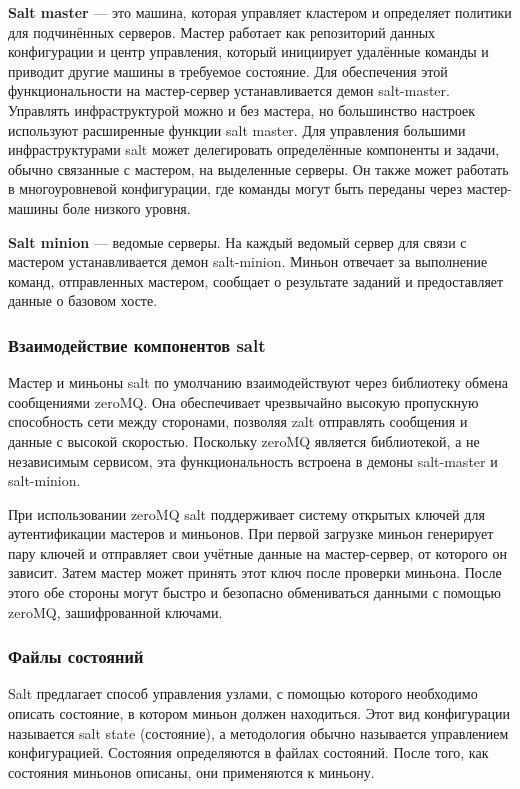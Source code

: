 \documentclass[a4paper]{extarticle}
\begin{document}
\bigbreak

\textbf{Salt master} --- это машина, которая управляет кластером и определяет политики для подчинённых серверов. Мастер работает как репозиторий данных конфигурации и центр управления, который инициирует удалённые команды и приводит другие машины в требуемое состояние. Для обеспечения этой функциональности на мастер-сервер устанавливается демон salt-master. Управлять инфраструктурой можно и без мастера, но большинство настроек используют расширенные функции salt master. Для управления большими инфраструктурами salt может делегировать определённые компоненты и задачи, обычно связанные с мастером, на выделенные серверы. Он также может работать в многоуровневой конфигурации, где команды могут быть переданы через мастер-машины боле низкого уровня.

\bigbreak

\textbf{Salt minion} --- ведомые серверы. На каждый ведомый сервер для связи с мастером устанавливается демон salt-minion. Миньон отвечает за выполнение команд, отправленных мастером, сообщает о результате заданий и предоставляет данные о базовом хосте.

\subsubsection{Взаимодействие компонентов salt}

Мастер и миньоны salt по умолчанию взаимодействуют через библиотеку обмена сообщениями zeroMQ. Она обеспечивает чрезвычайно высокую пропускную способность сети между сторонами, позволяя zalt отправлять сообщения и данные с высокой скоростью. Поскольку zeroMQ является библиотекой, а не независимым сервисом, эта функциональность встроена в демоны salt-master и salt-minion.

При использовании zeroMQ salt поддерживает систему открытых ключей для аутентификации мастеров и миньонов. При первой загрузке миньон генерирует пару ключей и отправляет свои учётные данные на мастер-сервер, от которого он зависит. Затем мастер может принять этот ключ после проверки миньона. После этого обе стороны могут быстро и безопасно обмениваться данными с помощью zeroMQ, зашифрованной ключами.

\subsubsection{Файлы состояний}

Salt предлагает способ управления узлами, с помощью которого необходимо описать состояние, в котором миньон должен находиться. Этот вид конфигурации называется salt state (состояние), а методология обычно называется управлением конфигурацией. Состояния определяются в файлах состояний. После того, как состояния миньонов описаны, они применяются к миньону.
\end{document}
